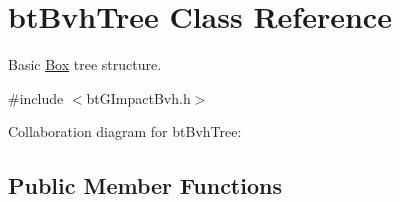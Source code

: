\hypertarget{classbt_bvh_tree}{\section{bt\+Bvh\+Tree Class Reference}
\label{classbt_bvh_tree}
}


Basic \hyperlink{class_box}{Box} tree structure.  




{\ttfamily \#include $<$bt\+G\+Impact\+Bvh.\+h$>$}



Collaboration diagram for bt\+Bvh\+Tree\+:
\subsection*{Public Member Functions}
{\bf }\par
